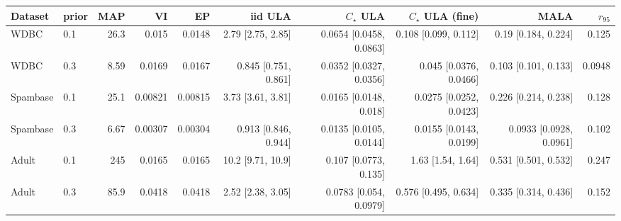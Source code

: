 \begin{tabular}{llrrrrrrrr}
\toprule
Dataset & prior & MAP & VI & EP & iid ULA & $C_\star$ ULA & $C_\star$ ULA (fine) & MALA & $r_{95}$ \\
\midrule
WDBC & 0.1 & 26.3 & 0.015 & 0.0148 & 2.79 [2.75, 2.85] & 0.0654 [0.0458, 0.0863] & 0.108 [0.099, 0.112] & 0.19 [0.184, 0.224] & 0.125 \\
WDBC & 0.3 & 8.59 & 0.0169 & 0.0167 & 0.845 [0.751, 0.861] & 0.0352 [0.0327, 0.0356] & 0.045 [0.0376, 0.0466] & 0.103 [0.101, 0.133] & 0.0948 \\
Spambase & 0.1 & 25.1 & 0.00821 & 0.00815 & 3.73 [3.61, 3.81] & 0.0165 [0.0148, 0.018] & 0.0275 [0.0252, 0.0423] & 0.226 [0.214, 0.238] & 0.128 \\
Spambase & 0.3 & 6.67 & 0.00307 & 0.00304 & 0.913 [0.846, 0.944] & 0.0135 [0.0105, 0.0144] & 0.0155 [0.0143, 0.0199] & 0.0933 [0.0928, 0.0961] & 0.102 \\
Adult & 0.1 & 245 & 0.0165 & 0.0165 & 10.2 [9.71, 10.9] & 0.107 [0.0773, 0.135] & 1.63 [1.54, 1.64] & 0.531 [0.501, 0.532] & 0.247 \\
Adult & 0.3 & 85.9 & 0.0418 & 0.0418 & 2.52 [2.38, 3.05] & 0.0783 [0.054, 0.0979] & 0.576 [0.495, 0.634] & 0.335 [0.314, 0.436] & 0.152 \\
\bottomrule
\end{tabular}
